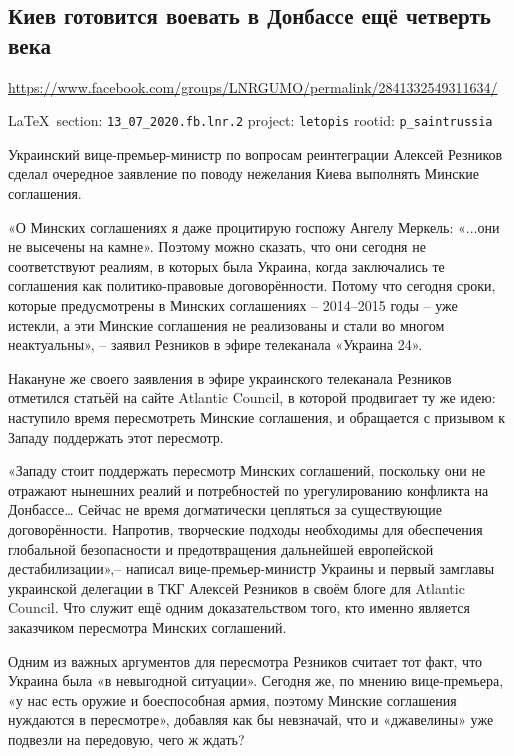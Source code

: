  
 

\subsection{Киев готовится воевать в Донбассе ещё четверть века}
\url{https://www.facebook.com/groups/LNRGUMO/permalink/2841332549311634/}
  
\vspace{0.5cm}
{\ifDEBUG\small\LaTeX~section: \verb|13_07_2020.fb.lnr.2| project: \verb|letopis| rootid: \verb|p_saintrussia|\fi}
\vspace{0.5cm}

Украинский вице-премьер-министр по вопросам реинтеграции Алексей Резников
сделал очередное заявление по поводу нежелания Киева выполнять Минские
соглашения.

«О Минских соглашениях я даже процитирую госпожу Ангелу Меркель: «...они не
высечены на камне». Поэтому можно сказать, что они сегодня не соответствуют
реалиям, в которых была Украина, когда заключались те соглашения как
политико-правовые договорённости. Потому что сегодня сроки, которые
предусмотрены в Минских соглашениях – 2014–2015 годы – уже истекли, а эти
Минские соглашения не реализованы и стали во многом неактуальны», – заявил
Резников в эфире телеканала «Украина 24».

Накануне же своего заявления в эфире украинского телеканала Резников отметился
статьёй на сайте Atlantic Council, в которой продвигает ту же идею: наступило
время пересмотреть Минские соглашения, и обращается с призывом к Западу
поддержать этот пересмотр.

«Западу стоит поддержать пересмотр Минских соглашений, поскольку они не
отражают нынешних реалий и потребностей по урегулированию конфликта на
Донбассе… Сейчас не время догматически цепляться за существующие
договорённости. Напротив, творческие подходы необходимы для обеспечения
глобальной безопасности и предотвращения дальнейшей европейской
дестабилизации»,– написал вице-премьер-министр Украины и первый замглавы
украинской делегации в ТКГ Алексей Резников в своём блоге для Atlantic Council.
Что служит ещё одним доказательством того, кто именно является заказчиком
пересмотра Минских соглашений.

Одним из важных аргументов для пересмотра Резников считает тот факт, что
Украина была «в невыгодной ситуации». Сегодня же, по мнению вице-премьера, «у
нас есть оружие и боеспособная армия, поэтому Минские соглашения нуждаются в
пересмотре», добавляя как бы невзначай, что и «джавелины» уже подвезли на
передовую, чего ж ждать?

